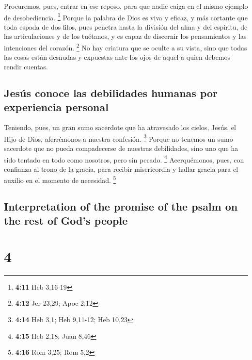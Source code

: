 \begin{paracol}{2}
 Procuremos, pues, entrar en ese reposo, para que nadie
caiga en el mismo ejemplo de desobediencia. \footnote{\textbf{4:11} Heb
  3,16-19}  Porque la palabra de Dios es viva y eficaz, y
más cortante que toda espada de dos filos, pues penetra hasta la
división del alma y del espíritu, de las articulaciones y de los
tuétanos, y es capaz de discernir los pensamientos y las intenciones del
corazón. \footnote{\textbf{4:12} Jer 23,29; Apoc 2,12} 
No hay criatura que se oculte a su vista, sino que todas las cosas están
desnudas y expuestas ante los ojos de aquel a quien debemos rendir
cuentas.

\hypertarget{jesuxfas-conoce-las-debilidades-humanas-por-experiencia-personal}{%
\subsection{Jesús conoce las debilidades humanas por experiencia
personal}\label{jesuxfas-conoce-las-debilidades-humanas-por-experiencia-personal}}

 Teniendo, pues, un gran sumo sacerdote que ha atravesado
los cielos, Jesús, el Hijo de Dios, aferrémonos a nuestra confesión.
\footnote{\textbf{4:14} Heb 3,1; Heb 9,11-12; Heb 10,23} 
Porque no tenemos un sumo sacerdote que no pueda compadecerse de
nuestras debilidades, sino uno que ha sido tentado en todo como
nosotros, pero sin pecado. \footnote{\textbf{4:15} Heb 2,18; Juan 8,46}
 Acerquémonos, pues, con confianza al trono de la gracia,
para recibir misericordia y hallar gracia para el auxilio en el momento
de necesidad. \footnote{\textbf{4:16} Rom 3,25; Rom 5,2}

\switchcolumn
\begin{otherlanguage}{english}

\hypertarget{interpretation-of-the-promise-of-the-psalm-on-the-rest-of-gods-people}{%
\subsection{Interpretation of the promise of the psalm on the rest of
God's
people}\label{interpretation-of-the-promise-of-the-psalm-on-the-rest-of-gods-people}}

\hypertarget{section-7}{%
\section{4}\label{section-7}}


\end{otherlanguage}
\end{paracol}
